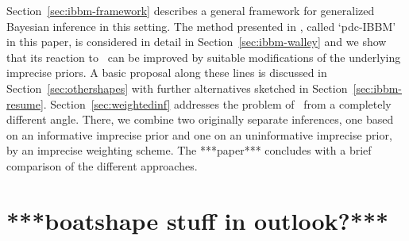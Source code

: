 \medskip

Section~\ref{sec:ibbm-framework} describes a general framework for
generalized Bayesian inference in this setting. The method presented in \textcite[\S 5.4.3]{1991:walley},
called `pdc-IBBM' in this paper, is considered in detail in Section~\ref{sec:ibbm-walley}
and we show that its reaction to \pdc\ can be improved
by suitable modifications of the underlying imprecise
priors. A basic proposal along these lines is discussed in
Section~\ref{sec:othershapes} with further alternatives
sketched in Section~\ref{sec:ibbm-resume}.
Section~\ref{sec:weightedinf} addresses the problem of \pdc\ from a
completely different angle. There, we combine two originally separate
inferences, one based on an informative imprecise prior and one
on an uninformative imprecise prior, by an imprecise weighting
scheme. The ***paper*** concludes with a brief comparison of the different
approaches.






\section{***boatshape stuff in outlook?***}



